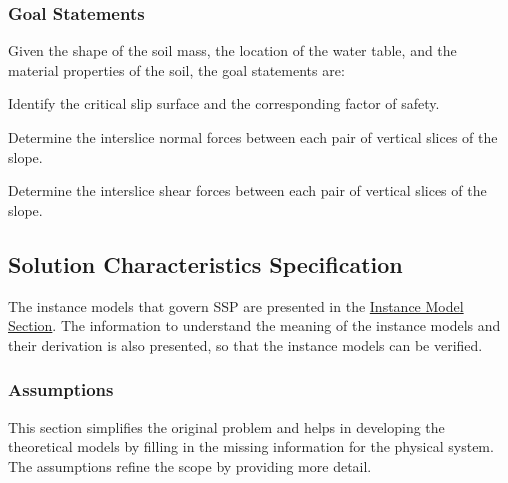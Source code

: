 \documentclass[12pt]{article}
\begin{document}
\subsubsection{Goal Statements}
\label{Sec:GoalStmt}
Given the shape of the soil mass, the location of the water table, and the material properties of the soil, the goal statements are:

\begin{description}[font=\normalfont]
\item[Identify-Crit-and-FS:\phantomsection\label{identifyCritAndFS}]{Identify the critical slip surface and the corresponding factor of safety.}
\item[Determine-Normal-Forces:\phantomsection\label{determineNormalF}]{Determine the interslice normal forces between each pair of vertical slices of the slope.}
\item[Determine-Shear-Forces:\phantomsection\label{determineShearF}]{Determine the interslice shear forces between each pair of vertical slices of the slope.}
\end{description}
\subsection{Solution Characteristics Specification}
\label{Sec:SolCharSpec}
The instance models that govern SSP are presented in the \hyperref[Sec:IMs]{Instance Model Section}. The information to understand the meaning of the instance models and their derivation is also presented, so that the instance models can be verified.

\subsubsection{Assumptions}
\label{Sec:Assumps}
This section simplifies the original problem and helps in developing the theoretical models by filling in the missing information for the physical system. The assumptions refine the scope by providing more detail.
\end{document}
